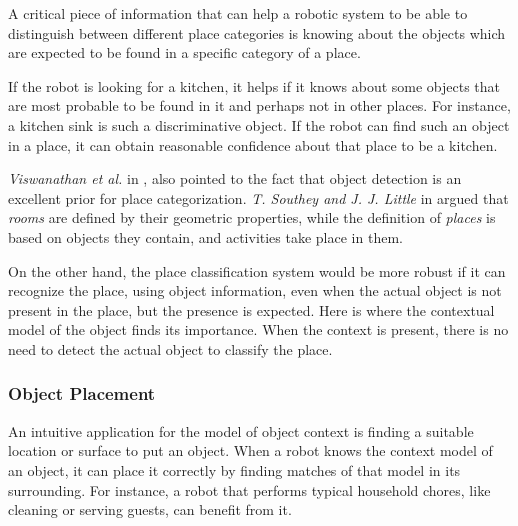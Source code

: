 A critical piece of information that can help a robotic system to be able to distinguish between different place categories 
is knowing about the objects which are expected to be found in a specific category of a place. 

If the robot is looking for a kitchen, it helps if it knows about some objects that are most probable to be found in it and 
perhaps not in other places. 
For instance, a kitchen sink is such a discriminative object. 
If the robot can find such an object in a place, it can obtain reasonable confidence about that place to be a kitchen. 

{\it Viswanathan et al.} in \cite{P.Viswanathan}, also pointed to the fact that object detection is an excellent prior for place 
categorization. {\it T. Southey and J. J. Little} in \cite{southey2006object} argued that {\it rooms} are defined by their geometric 
properties, while the definition of {\it places} is based on objects they contain, and activities take place in them.  

On the other hand, the place classification system would be more robust if it can recognize the place, using object information, 
even when the actual object is not present in the place, but the presence is expected.
Here is where the contextual model of the object finds its importance. When the context is present, there is no need to detect the actual 
object to classify the place.

 
 
 \subsubsection*{Object Placement} 
 
 An intuitive application for the model of object context is finding a suitable location or surface to put an object.
 When a robot knows the context model of an object, it can place it correctly by finding matches of that model in its 
 surrounding.
 For instance, a robot that performs typical household chores, like cleaning or serving guests, can benefit from it.  
 


